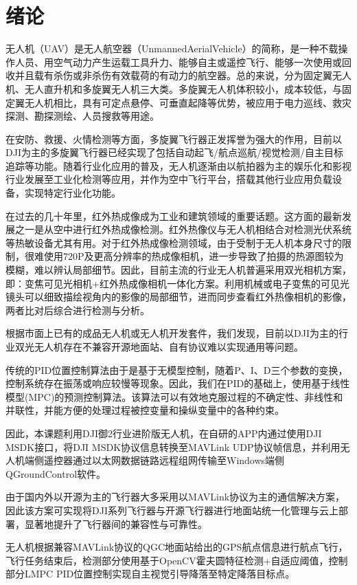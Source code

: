 \chapter{绪论}

无人机（UAV）是无人航空器（UnmannedAerialVehicle）的简称，是一种不载操作人员、用空气动力产生运载工具升力、能够自主或遥控飞行、能够一次使用或回收并且载有杀伤或非杀伤有效载荷的有动力的航空器。总的来说，分为固定翼无人机、无人直升机和多旋翼无人机三大类。多旋翼无人机体积较小，成本较低，与固定翼无人机相比，具有可定点悬停、可垂直起降等优势，被应用于电力巡线、救灾探测、勘探测绘、人员搜救等用途。

在安防、救援、火情检测等方面，多旋翼飞行器正发挥誉为强大的作用，目前以DJI为主的多旋翼飞行器已经实现了包括自动起飞/航点巡航/视觉检测/自主目标追踪等功能。随着行业化应用的普及，无人机逐渐由以航拍器为主的娱乐化和影视行业发展至工业化检测等应用，并作为空中飞行平台，搭载其他行业应用负载设备，实现特定行业化功能。

在过去的几十年里，红外热成像成为工业和建筑领域的重要话题。这方面的最新发展之一是从空中进行红外热成像检测。红外热像仪与无人机相结合对检测光伏系统等热敏设备尤其有用。对于红外热成像检测领域，由于受制于无人机本身尺寸的限制，很难使用720P及更高分辨率的热成像相机，进一步导致了拍摄的热源图较为模糊，难以辨认局部细节。因此，目前主流的行业无人机普遍采用双光相机方案，即：变焦可见光相机+红外热成像相机一体化方案。利用机械或电子变焦的可见光镜头可以细致描绘视角内的影像的局部细节，进而同步查看红外热像相机的影像，两者比对后综合进行检测与分析。

根据市面上已有的成品无人机或无人机开发套件，我们发现，目前以DJI为主的行业双光无人机存在不兼容开源地面站、自有协议难以实现通用等问题。

传统的PID位置控制算法由于是基于无模型控制，随着P、I、D三个参数的变换，控制系统存在振荡或响应较慢等现象。因此，我们在PID的基础上，使用基于线性模型(MPC)的预测控制算法。该算法可以有效地克服过程的不确定性、非线性和并联性，并能方便的处理过程被控变量和操纵变量中的各种约束。

因此，本课题利用DJI御2行业进阶版无人机，在自研的APP内通过使用DJI MSDK接口，将DJI MSDK协议信息转换至MAVLink UDP协议帧信息，并利用无人机端侧遥控器通过以太网数据链路远程组网传输至Windows端侧QGroundControl软件。

由于国内外以开源为主的飞行器大多采用以MAVLink协议为主的通信解决方案，因此该方案可实现将DJI系列飞行器与开源飞行器进行地面站统一化管理与云上部署，显著地提升了飞行器间的兼容性与可靠性。

无人机根据兼容MAVLink协议的QGC地面站给出的GPS航点信息进行航点飞行，飞行任务结束后，检测部分使用基于OpenCV霍夫圆特征检测+自适应阈值，控制部分LMPC PID位置控制实现自主视觉引导降落至特定降落目标点。

